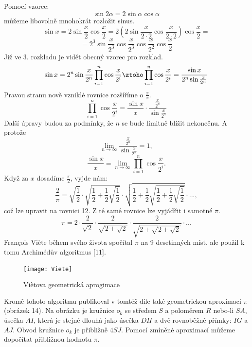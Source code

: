\documentclass[rocnikovka]{gzwroc} %
\begin{document}
Pomocí vzorce:
$$
\sin 2\alpha = 2\sin \alpha \cos \alpha
$$
můžeme libovolně mnohokrát rozložit sinus.
$$
\sin x = 2\sin \frac{x}{2} \cos \frac{x}{2} = 2\left( 2\sin \frac{x}{2\cdot 2} \cos \frac{x}{2\cdot 2}\right) \cos \frac{x}{2} =
$$
\begin{equation*}
= 2^3 \sin \frac{x}{2^3} \cos \frac{x}{2^3} \cos \frac{x}{2^2} \cos \frac{x}{2}
\end{equation*}
Již ve 3. rozkladu je vidět obecný vzorec pro rozklad.
\begin{equation*}
\sin x =2^n \sin \frac{x}{2^n}\prod_{i=1}^{n} \cos \frac{x}{2^i} \ztoho \prod_{i=1}^{n} \cos \frac{x}{2^i} = \frac{\sin x}{2^n \sin \frac{x}{2^n}}
\end{equation*}
Pravou stranu nově vzniklé rovnice rozšíříme o $\frac{x}{x}$.
\begin{equation}
\prod_{i=1}^{n} \cos \frac{x}{2^i} = \frac{\sin x}{x} \cdot  \frac{\frac{x}{2^n}}{\sin \frac{x}{2^n}}
\end{equation}
Další úpravy budou za podmínky, že $n$ se bude limitně blížit nekonečnu. A protože
$$
\lim_{n\to\infty} \frac{\frac{x}{2^n}}{\sin \frac{x}{2^n}} = 1,
$$
\begin{equation}
\frac{\sin x}{x} = \lim_{n\to\infty} \prod_{i=1}^{n} \cos \frac{x}{2^i}.
\end{equation}
Když za $x$ dosadíme $\frac{\pi}{2}$, vyjde nám:
\begin{equation}
\frac{2}{\pi}=\sqrt{\frac{1}{2}}\cdot\sqrt{\frac{1}{2}+\frac{1}{2}\sqrt{\frac{1}{2}}}\cdot\sqrt{\frac{1}{2}+\frac{1}{2}\sqrt{\frac{1}{2}+\frac{1}{2}\sqrt{\frac{1}{2}}}}\cdot ...,
\end{equation}
což lze upravit na rovnici 12. Z té samé rovnice lze vyjádřit i samotné $\pi$.
$$
\pi=2\cdot\frac{2}{\sqrt{2}}\cdot\frac{2}{\sqrt{2+\sqrt{2}}}\cdot\frac{2}{\sqrt{2+\sqrt{2+\sqrt{2}}}}\cdot ...
$$
François Viète během svého života spočítal $\pi$ na 9 desetinných míst, ale použil k tomu Archimédův algoritmus [11].

\begin{figure}[!ht]
\texttt{[image: Viete]}
\caption{Viètova geometrická aprogimace}
\label{fig:kruh}
\end{figure}
Kromě tohoto algoritmu publikoval v tomtéž díle také geometrickou aproximaci $\pi$ (obrázek 14). Na obrázku je kružnice $o_k$ se středem $S$ a poloměrem $R$ nebo-li $SA$, úsečka $AI$, která je stejně dlouhá jako úsečka $DH$ a dvě rovnoběžné přímky: $IG$ a $AJ$. Obvod kružnice $o_k$ je přibližně $4SJ$. Pomocí zmíněné aproximací můžeme dopočítat přibližnou hodnotu $\pi$.
\end{document}
